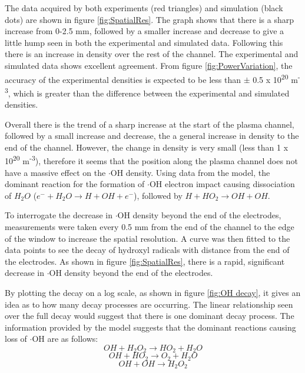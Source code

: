 \documentclass[11pt, oneside]{article}   	%
\begin{document}
The data acquired by both experiments (red triangles) and simulation (black dots) are shown in figure \ref{fig:SpatialRes}.
The graph shows that there is a sharp increase from 0-2.5 mm, followed by a smaller increase and decrease to give a little hump seen in both the experimental and simulated data. Following this there is an increase in density over the rest of the channel.
The experimental and simulated data shows excellent agreement.
From figure \ref{fig:PowerVariation}, the accuracy of the experimental densities is expected to be less than $\pm$ 0.5 x 10\textsuperscript{20} m\textsuperscript{-3}, which is greater than the difference between the experimental and simulated densities.

Overall there is the trend of a sharp increase at the start of the plasma channel, followed by a small increase and decrease, the a general increase in density to the end of the channel. 
However, the change in density is very small (less than 1 x 10\textsuperscript{20} m\textsuperscript{-3}), therefore it seems that the position along the plasma channel does not have a massive effect on the $\cdot$OH density.
Using data from the model, the dominant reaction for the formation of $\cdot$OH electron impact causing dissociation of $H_2O$ ($e^- + H_2O \rightarrow H + OH + e^-$), followed by $H + HO_2 \rightarrow OH + OH$.

To interrogate the decrease in $\cdot$OH density beyond the end of the electrodes, measurements were taken every 0.5 mm from the end of the channel to the edge of the window to increase the spatial resolution.
A curve was then fitted to the data points to see the decay of hydroxyl radicals with distance from the end of the electrodes.
As shown in figure \ref{fig:SpatialRes}, there is a rapid, significant decrease in $\cdot$OH density beyond the end of the electrodes.

By plotting the decay on a log scale, as shown in figure \ref{fig:OH decay}, it gives an idea as to how many decay processes are occurring. The linear relationship seen over the full decay would suggest that there is one dominant decay process. 
The information provided by the model suggests that the dominant reactions causing loss of $\cdot$OH are as follows:
\begin{equation}
OH + H_2O_2 \rightarrow  HO_2 + H_2O
\end{equation}
\begin{equation}
OH +HO_2 \rightarrow O_2 +H_2O
\end{equation}
\begin{equation}
OH + OH \rightarrow H_2O_2
\end{equation}
\end{document}
